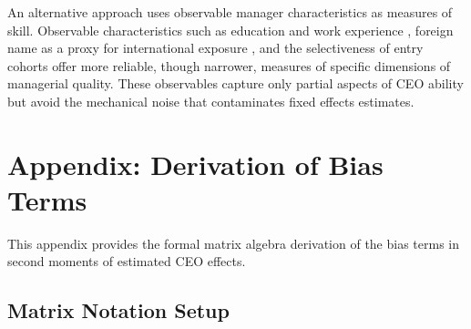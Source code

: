 \documentclass[11pt,a4paper]{article}
\begin{document}
An alternative approach uses observable manager characteristics as measures of skill. Observable characteristics such as education and work experience \citep{DePirro2025}, foreign name as a proxy for international exposure \citep{Koren2023expat}, and the selectiveness of entry cohorts \citep{koren2024managers} offer more reliable, though narrower, measures of specific dimensions of managerial quality. These observables capture only partial aspects of CEO ability but avoid the mechanical noise that contaminates fixed effects estimates.

\clearpage
\appendix
\renewcommand{\thefigure}{A\arabic{figure}}
\renewcommand{\thetable}{A\arabic{table}}
\setcounter{figure}{0}
\setcounter{table}{0}


\section{Appendix: Derivation of Bias Terms}
This appendix provides the formal matrix algebra derivation of the bias terms in second moments of estimated CEO effects.

\subsection{Matrix Notation Setup}
\end{document}
